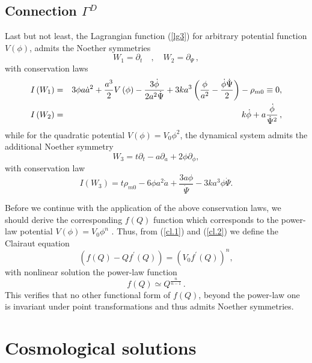 \documentclass[onecolumn,superscriptaddress,secnumarabic,nobibnotes,aps,prd,nofootinbib,altaffilletter,11pt]{revtex4}
\begin{document}
\subsection{Connection $\Gamma ^{D}$}

Last but not least, the Lagrangian function (\ref{lg3}) for arbitrary potential function $V\left(
\phi \right) $, admits the Noether symmetries 
\begin{equation*}
W_{1} =\partial _{t}\quad , \quad W_{2} = \partial _{\Psi }\,,    
\end{equation*}
with conservation laws%
\begin{eqnarray}
I\left( W_{1}\right) &=&3\phi a\dot{a}^{2}+\frac{a^{3}}{2}V\left( \phi
\right) -\frac{3\dot{\phi}}{2a^{2}\dot{\Psi}}+3ka^{3}\left( \frac{\phi }{%
a^{2}}-\frac{\dot{\phi}\dot{\Psi}}{2}\right) -\rho _{m0}\equiv 0, \\
I\left( W_{2}\right) &=&k\dot{\phi}+a\frac{\dot{\phi}}{\dot{\Psi}^{2}}\,,
\end{eqnarray}
while for the quadratic potential $V\left( \phi \right) =V_{0}\phi ^{2}$, the dynamical system admits the additional Noether symmetry%
\begin{equation*}
W_{3}=t\partial _{t}-a\partial _{a}+2\phi \partial _{\phi },
\end{equation*}%
with conservation law%
\begin{equation}
I\left( W_{3}\right) =t\rho _{m0}-6\phi a^{2}\dot{a}+\frac{3a\phi }{\dot{\Psi%
}}-3ka^{3}\phi \dot{\Psi}.
\end{equation}

Before we continue with the application of the above conservation laws, we
should derive the corresponding $f\left( Q\right) $ function which
corresponds to the power-law potential $V\left( \phi \right) =V_{0}\phi ^{n}$%
. Thus, from (\ref{cl.1}) and (\ref{cl.2}) we define the Clairaut equation 
\begin{equation}
\left( f(Q)-Qf^{\prime }(Q)\right) =\left( V_{0}f^{\prime }\left( Q\right)
\right) ^{n},
\end{equation}%
with nonlinear solution the power-law function 
\begin{equation}
f\left( Q\right) \simeq Q^{\frac{n}{n-1}}\,.
\end{equation}
This verifies that no other functional form of $f(Q)$, beyond the power-law one is invariant under point transformations and thus admits Noether symmetries. 



\section{Cosmological solutions}
\end{document}
